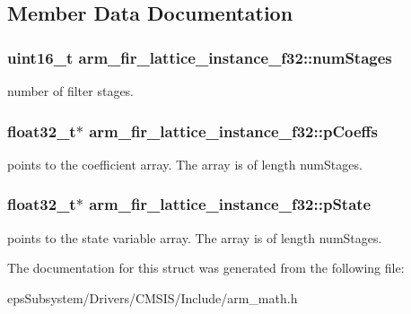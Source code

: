 \subsection{Member Data Documentation}
\hypertarget{structarm__fir__lattice__instance__f32_ad369bd9997a250f195254df37408a38f}{
\subsubsection[{num\-Stages}]{\setlength{\rightskip}{0pt plus 5cm}uint16\-\_\-t arm\-\_\-fir\-\_\-lattice\-\_\-instance\-\_\-f32\-::num\-Stages}}\label{structarm__fir__lattice__instance__f32_ad369bd9997a250f195254df37408a38f}
number of filter stages. \hypertarget{structarm__fir__lattice__instance__f32_a33bf5948c947f9ef80a99717cb0a0a43}{
\subsubsection[{p\-Coeffs}]{\setlength{\rightskip}{0pt plus 5cm}float32\-\_\-t$\ast$ arm\-\_\-fir\-\_\-lattice\-\_\-instance\-\_\-f32\-::p\-Coeffs}}\label{structarm__fir__lattice__instance__f32_a33bf5948c947f9ef80a99717cb0a0a43}
points to the coefficient array. The array is of length num\-Stages. \hypertarget{structarm__fir__lattice__instance__f32_ae348884a1ba9b83fadccd5da640cbcaf}{
\subsubsection[{p\-State}]{\setlength{\rightskip}{0pt plus 5cm}float32\-\_\-t$\ast$ arm\-\_\-fir\-\_\-lattice\-\_\-instance\-\_\-f32\-::p\-State}}\label{structarm__fir__lattice__instance__f32_ae348884a1ba9b83fadccd5da640cbcaf}
points to the state variable array. The array is of length num\-Stages. 

The documentation for this struct was generated from the following file\-:\begin{DoxyCompactItemize}
\item 
eps\-Subsystem/\-Drivers/\-C\-M\-S\-I\-S/\-Include/arm\-\_\-math.\-h\end{DoxyCompactItemize}
